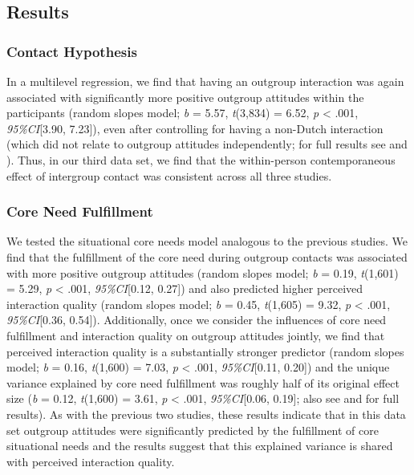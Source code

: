 \subsection{Results}

\subsubsection{Contact Hypothesis}

In a multilevel regression, we find that having an outgroup interaction
was again associated with significantly more positive outgroup attitudes
within the participants (random slopes model; \textit{b} = 5.57,
\textit{t}(3,834) = 6.52, \textit{p} \textless{} .001,
\textit{95\%CI}{[}3.90, 7.23{]}), even after controlling for having a
non-Dutch interaction (which did not relate to outgroup attitudes
independently; for full results see
 and
). Thus, in our third data set, we find
that the within-person contemporaneous effect of intergroup contact was
consistent across all three studies.

\subsubsection{Core Need Fulfillment}

We tested the situational core needs model analogous to the previous
studies. We find that the fulfillment of the core need during outgroup
contacts was associated with more positive outgroup attitudes (random
slopes model; \textit{b} = 0.19, \textit{t}(1,601) = 5.29, \textit{p}
\textless{} .001, \textit{95\%CI}{[}0.12, 0.27{]}) and also predicted
higher perceived interaction quality (random slopes model; \textit{b} =
0.45, \textit{t}(1,605) = 9.32, \textit{p} \textless{} .001,
\textit{95\%CI}{[}0.36, 0.54{]}). Additionally, once we consider the
influences of core need fulfillment and interaction quality on outgroup
attitudes jointly, we find that perceived interaction quality is a
substantially stronger predictor (random slopes model; \textit{b} =
0.16, \textit{t}(1,600) = 7.03, \textit{p} \textless{} .001,
\textit{95\%CI}{[}0.11, 0.20{]}) and the unique variance explained by
core need fulfillment was roughly half of its original effect size
(\textit{b} = 0.12, \textit{t}(1,600) = 3.61, \textit{p} \textless{}
.001, \textit{95\%CI}{[}0.06, 0.19{]}; also see
 and  for
full results). As with the previous two studies, these results indicate
that in this data set outgroup attitudes were significantly predicted by
the fulfillment of core situational needs and the results suggest that
this explained variance is shared with perceived interaction quality.


